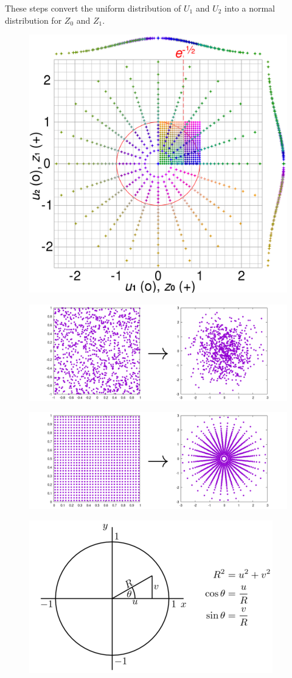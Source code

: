 \documentclass{article}
\begin{document}
These steps convert the uniform distribution of \( U_1 \) and \( U_2 \) into a normal distribution for \( Z_0 \) and \( Z_1 \).
\begin{figure}
    \centering
    \includegraphics[width=0.5\linewidth]{figures/1200px-Box-Muller_transform_visualisation.svg.png}
    
    
\end{figure}
\begin{figure}
    \centering
    \includegraphics[width=0.75\linewidth]{ox-hilary/simulation-methods/figures/polar_rand_transform.png}
\end{figure}
\begin{figure}
    \centering
    \includegraphics[width=0.75\linewidth]{ox-hilary/simulation-methods/figures/cartesian_grid_transform.png}
\end{figure}
\begin{figure}
    \centering
    \includegraphics[width=0.75\linewidth]{ox-hilary/simulation-methods/figures/400px-BoxMullerTransformUsingPolarCoordinates.png}
\end{figure}
\end{document}
